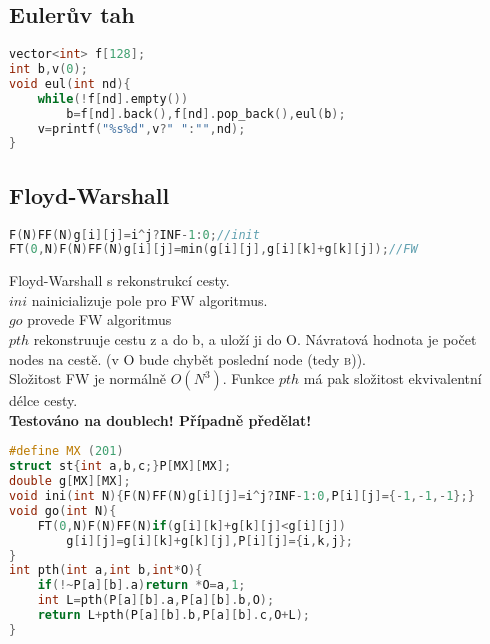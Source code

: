 \documentclass[11pt]{article}
\begin{document}
\subsection{Eulerův tah}
\begin{lstlisting}[language=C++]
vector<int> f[128];
int b,v(0);
void eul(int nd){
    while(!f[nd].empty())
        b=f[nd].back(),f[nd].pop_back(),eul(b);
    v=printf("%s%d",v?" ":"",nd);
}
\end{lstlisting}
\subsection{Floyd-Warshall}
\begin{lstlisting}[language=C++]
F(N)FF(N)g[i][j]=i^j?INF-1:0;//init
FT(0,N)F(N)FF(N)g[i][j]=min(g[i][j],g[i][k]+g[k][j]);//FW
\end{lstlisting}
Floyd-Warshall s rekonstrukcí cesty.
\\$ini$ nainicializuje pole pro FW algoritmus.
\\$go$ provede FW algoritmus
\\$pth$ rekonstruuje cestu z \textsf{a} do \textsf{b}, a uloží ji do \textsf{O}. Návratová hodnota je počet nodes na cestě. (v \textsf{O} bude chybět poslední node (tedy \textsc{b})).
\\Složitost FW je normálně $O(N^3)$. Funkce $pth$ má pak složitost ekvivalentní délce cesty.
\\\textbf{Testováno na doublech! Případně předělat!}
\begin{lstlisting}[language=C++]
#define MX (201)
struct st{int a,b,c;}P[MX][MX];
double g[MX][MX];
void ini(int N){F(N)FF(N)g[i][j]=i^j?INF-1:0,P[i][j]={-1,-1,-1};}
void go(int N){
    FT(0,N)F(N)FF(N)if(g[i][k]+g[k][j]<g[i][j])
        g[i][j]=g[i][k]+g[k][j],P[i][j]={i,k,j};
}
int pth(int a,int b,int*O){
    if(!~P[a][b].a)return *O=a,1;
    int L=pth(P[a][b].a,P[a][b].b,O);
    return L+pth(P[a][b].b,P[a][b].c,O+L);
}
\end{lstlisting}
\end{document}
